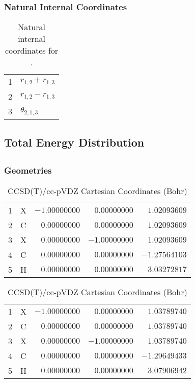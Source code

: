 \documentclass[10pt,oneside]{article}
\begin{document}
\begin{table}[h!]
\subsubsection*{Natural Internal Coordinates}
\centering
\caption{Natural internal coordinates for .}
\small
\begin{tabular}{ll}
\toprule
  1   & $r_{1,2} + r_{1,3}$ \\
  2   & $r_{1,2} - r_{1,3}$ \\
  3   & $\theta_{2,1,3}$ \\
\bottomrule
\end{tabular}
\end{table}

\begin{table}
\subsection*{Total Energy Distribution}
\centering\end{table}

\clearpage

\subsection{}

\begin{table}[h!]
\subsubsection*{Geometries}
\begin{multicols}{2}
\centering
\caption{CCSD(T)/cc-pVTZ Cartesian Coordinates (Bohr)}
\begin{tabular}{llrrr}
\toprule
1  & X  & $-1.00000000$ & $ 0.00000000$ & $ 1.02093609$ \\
2  & C  & $ 0.00000000$ & $ 0.00000000$ & $ 1.02093609$ \\
3  & X  & $ 0.00000000$ & $-1.00000000$ & $ 1.02093609$ \\
4  & C  & $ 0.00000000$ & $ 0.00000000$ & $-1.27564103$ \\
5  & H  & $ 0.00000000$ & $ 0.00000000$ & $ 3.03272817$ \\
\bottomrule
\end{tabular}
\caption{CCSD(T)/cc-pVDZ Cartesian Coordinates (Bohr)}
\begin{tabular}{llrrr}
\toprule
1  & X  & $-1.00000000$ & $ 0.00000000$ & $ 1.03789740$ \\
2  & C  & $ 0.00000000$ & $ 0.00000000$ & $ 1.03789740$ \\
3  & X  & $ 0.00000000$ & $-1.00000000$ & $ 1.03789740$ \\
4  & C  & $ 0.00000000$ & $ 0.00000000$ & $-1.29649433$ \\
5  & H  & $ 0.00000000$ & $ 0.00000000$ & $ 3.07906942$ \\
\bottomrule
\end{tabular}
\end{multicols}
\end{table}
\end{document}
